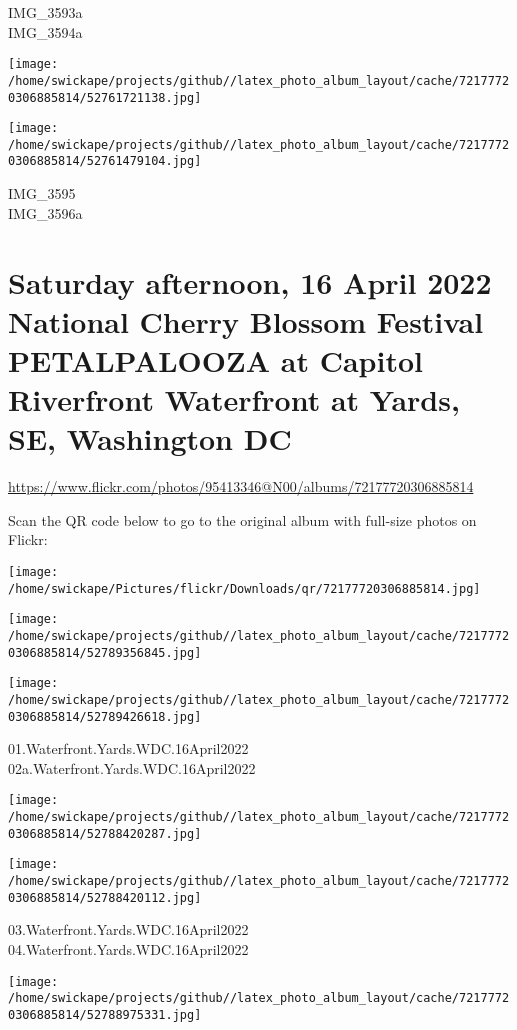 \documentclass[10pt,letterpaper]{article}
\begin{document}
IMG\_3593a\\
IMG\_3594a
\pagebreak

\texttt{[image: /home/swickape/projects/github//latex\_photo\_album\_layout/cache/72177720306885814/52761721138.jpg]}

\vspace{0.25in}
\texttt{[image: /home/swickape/projects/github//latex\_photo\_album\_layout/cache/72177720306885814/52761479104.jpg]}

IMG\_3595\\
IMG\_3596a
\pagebreak

\section*{Saturday afternoon, 16 April 2022 National Cherry Blossom Festival PETALPALOOZA at Capitol Riverfront Waterfront at Yards, SE, Washington DC}

\url{https://www.flickr.com/photos/95413346@N00/albums/72177720306885814}

Scan the QR code below to go to the original album with full-size photos on Flickr:

\texttt{[image: /home/swickape/Pictures/flickr/Downloads/qr/72177720306885814.jpg]}
\pagebreak

\texttt{[image: /home/swickape/projects/github//latex\_photo\_album\_layout/cache/72177720306885814/52789356845.jpg]}

\vspace{0.25in}
\texttt{[image: /home/swickape/projects/github//latex\_photo\_album\_layout/cache/72177720306885814/52789426618.jpg]}

01.Waterfront.Yards.WDC.16April2022\\
02a.Waterfront.Yards.WDC.16April2022
\pagebreak

\texttt{[image: /home/swickape/projects/github//latex\_photo\_album\_layout/cache/72177720306885814/52788420287.jpg]}

\vspace{0.25in}
\texttt{[image: /home/swickape/projects/github//latex\_photo\_album\_layout/cache/72177720306885814/52788420112.jpg]}

03.Waterfront.Yards.WDC.16April2022\\
04.Waterfront.Yards.WDC.16April2022
\pagebreak

\texttt{[image: /home/swickape/projects/github//latex\_photo\_album\_layout/cache/72177720306885814/52788975331.jpg]}
\end{document}

